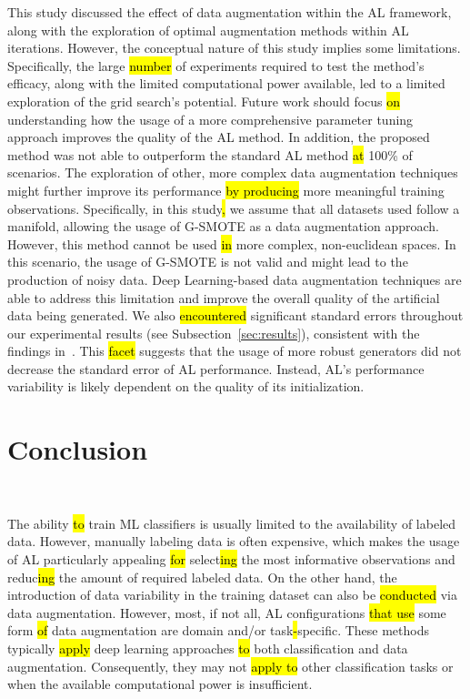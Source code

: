 \documentclass[preprint, 12pt]{elsarticle}
\begin{document}
This study discussed the effect of data augmentation within the AL framework,
along with the exploration of optimal augmentation methods within AL
iterations. However, the conceptual nature of this study implies some
limitations. Specifically, the large \hl{number} of experiments required to
test the method's efficacy, along with the limited computational power
available, led to a limited exploration of the grid search's potential. Future
work should focus \hl{on} understanding how the usage of a more comprehensive
parameter tuning approach improves the quality of the AL method. In addition,
the proposed method was not able to outperform the standard AL method \hl{at}
100\% of scenarios. The exploration of other, more complex data augmentation
techniques might further improve its performance \hl{by producing} more
meaningful training observations. Specifically, in this study\hl{,} we assume
that all datasets used follow a manifold, allowing the usage of G-SMOTE as a
data augmentation approach. However, this method cannot be used \hl{in} more
complex, non-euclidean spaces. In this scenario, the usage of G-SMOTE is not
valid and might lead to the production of noisy data. Deep Learning-based data
augmentation techniques are able to address this limitation and improve the
overall quality of the artificial data being generated. We also
\hl{encountered} significant standard errors throughout our experimental
results (see Subsection~\ref{sec:results}), consistent with the findings
in~\cite{Fonseca2021, Kottke2017}. This \hl{facet} suggests that the usage of
more robust generators did not decrease the standard error of AL performance.
Instead, AL's performance variability is likely dependent on the quality of
its initialization.

\section{Conclusion}~\label{sec:conclusion}

The ability \hl{to} train ML classifiers is usually limited to the
availability of labeled data. However, manually labeling data is often
expensive, which makes the usage of AL particularly appealing \hl{for}
select\hl{ing} the most informative observations and reduc\hl{ing} the amount
of required labeled data. On the other hand, the introduction of data
variability in the training dataset can also be \hl{conducted} via data augmentation.
However, most, if not all, AL configurations \hl{that use} some form \hl{of}
data augmentation are domain and/or task\hl{-}specific. These methods
typically \hl{apply} deep learning approaches \hl{to} both classification and
data augmentation. Consequently, they may not \hl{apply to} other
classification tasks or when the available computational power is
insufficient.
\end{document}
